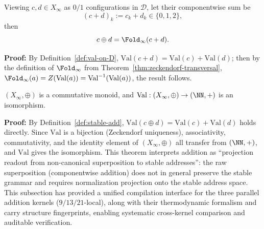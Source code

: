 \begin{corollary}\label{cor:add-as-fold}
Viewing $c,d\in X_\infty$ as $0/1$ configurations in $\mathcal{D}$, let their componentwise sum be
\[
(c+d)_k:=c_k+d_k\in\{0,1,2\},
\]
then
\[
c\oplus d=\Fold_\infty(c+d).
\]
\end{corollary}

\textbf{Proof:}
By Definition~\ref{def:val-on-D}, $\mathrm{Val}(c+d)=\mathrm{Val}(c)+\mathrm{Val}(d)$; then by the definition of $\Fold_\infty$ from Theorem~\ref{thm:zeckendorf-transversal}, $\Fold_\infty(a)=Z(\mathrm{Val}(a))=\mathrm{Val}^{-1}(\mathrm{Val}(a))$, the result follows.

\begin{theorem}\label{thm:add-definitional}
$(X_\infty,\oplus)$ is a commutative monoid, and $\mathrm{Val}:(X_\infty,\oplus)\to(\NN,+)$ is an isomorphism.
\end{theorem}

\textbf{Proof:}
By Definition~\ref{def:stable-add}, $\mathrm{Val}(c\oplus d)=\mathrm{Val}(c)+\mathrm{Val}(d)$ holds directly. Since $\mathrm{Val}$ is a bijection (Zeckendorf uniqueness), associativity, commutativity, and the identity element of $(X_\infty,\oplus)$ all transfer from $(\NN,+)$, and $\mathrm{Val}$ gives the isomorphism.
This theorem interprets addition as ``projection readout from non-canonical superposition to stable addresses'': the raw superposition (componentwise addition) does not in general preserve the stable grammar and requires normalization projection onto the stable address space.
\vspace{\baselineskip}
\noindent This subsection has provided a unified compilation interface for the three parallel addition kernels ($9/13/21$-local), along with their thermodynamic formalism and carry structure fingerprints, enabling systematic cross-kernel comparison and auditable verification.



